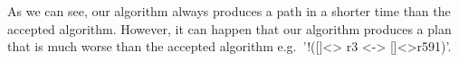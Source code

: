 As we can see, our algorithm always produces a path in a shorter time than the accepted algorithm. However, it can happen that our algorithm produces a plan that is much worse than the accepted algorithm e.g.\ '!([]<> r3 <-> []<>r591)'. 

%
%
%
%

